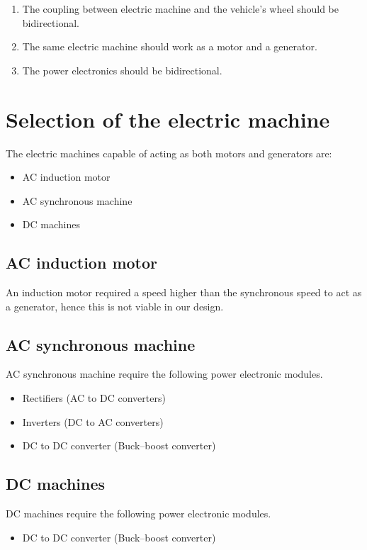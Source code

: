 \documentclass[journal]{IEEEtran}
\begin{document}
\begin{tcolorbox}[colback=blue!0!white,colframe=blue!75!black,title=Conditions]
\begin{enumerate}
  \item The coupling between electric machine and the vehicle's wheel should be bidirectional.
  \item The same electric machine should work as a motor and a generator.
  \item The power electronics should be bidirectional.
\end{enumerate}
\end{tcolorbox}

\section{Selection of the electric machine}
The electric machines capable of acting as both motors and generators are:
\begin{itemize}
  \item AC induction motor
  \item AC synchronous machine
  \item DC machines
\end{itemize}
\subsection{AC induction motor}
An induction motor required a speed higher than the synchronous speed to act as a generator, hence this is not viable in our design.
\subsection{AC synchronous machine}
AC synchronous machine require the following power electronic modules.
\begin{itemize}
  \item Rectifiers (AC to DC converters)
  \item Inverters (DC to AC converters)
  \item DC to DC converter (Buck–boost converter)
\end{itemize}
\subsection{DC machines}
DC machines require the following power electronic modules.
\begin{itemize}
  \item DC to DC converter (Buck–boost converter)
\end{itemize}
\end{document}
